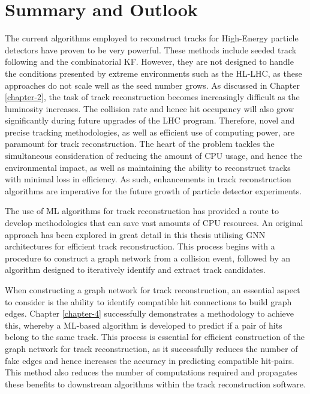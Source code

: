 

\chapter{Summary and Outlook}
\label{chapter-8}


The current algorithms employed to reconstruct tracks for High-Energy particle detectors have proven to be very powerful. These methods include seeded track following and the combinatorial KF. However, they are not designed to handle the conditions presented by extreme environments such as the HL-LHC, as these approaches do not scale well as the seed number grows. As discussed in Chapter \ref{chapter-2}, the task of track reconstruction becomes increasingly difficult as the luminosity increases. The collision rate and hence hit occupancy will also grow significantly during future upgrades of the LHC program. Therefore, novel and precise tracking methodologies, as well as efficient use of computing power, are paramount for track reconstruction. The heart of the problem tackles the simultaneous consideration of reducing the amount of CPU usage, and hence the environmental impact, as well as maintaining the ability to reconstruct tracks with minimal loss in efficiency. As such, enhancements in track reconstruction algorithms are imperative for the future growth of particle detector experiments. 

The use of ML algorithms for track reconstruction has provided a route to develop methodologies that can save vast amounts of CPU resources. An original approach has been explored in great detail in this thesis utilising GNN architectures for efficient track reconstruction. This process begins with a procedure to construct a graph network from a collision event, followed by an algorithm designed to iteratively identify and extract track candidates. 



When constructing a graph network for track reconstruction, an essential aspect to consider is the ability to identify compatible hit connections to build graph edges. Chapter \ref{chapter-4} successfully demonstrates a methodology to achieve this, whereby a ML-based algorithm is developed to predict if a pair of hits belong to the same track. This process is essential for efficient construction of the graph network for track reconstruction, as it successfully reduces the number of fake edges and hence increases the accuracy in predicting compatible hit-pairs. This method also reduces the number of computations required and propagates these benefits to downstream algorithms within the track reconstruction software.


